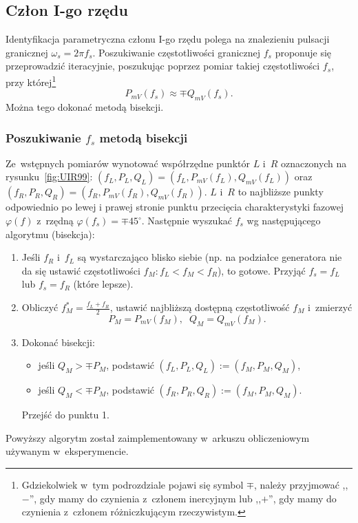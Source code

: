 \documentclass[paper=a4,DIV=12]{lpas}
\newcommand{\degree}{^{\circ}}
\begin{document}
\begin{appendices}
  \subsection{Człon I-go rzędu}
  \label{sec:4C7KI}

  Identyfikacja parametryczna członu I-go rzędu polega na znalezieniu pulsacji
  granicznej $\omega_s = 2 \pi f_s$. Poszukiwanie częstotliwości granicznej
  $f_s$ proponuje się przeprowadzić iteracyjnie, poszukując poprzez pomiar
  takiej częstotliwości $f_s$, przy której\footnote{Gdziekolwiek w~tym
  podrozdziale pojawi się symbol $\mp$, należy przyjmować ,,$-$'', gdy mamy do
  czynienia z~członem inercyjnym lub ,,$+$'', gdy mamy do czynienia z~członem
  różniczkującym rzeczywistym.}
  \begin{equation}
    P_{mV}(f_s) \approx \mp Q_{mV}(f_s).
    \label{eq:7M2JN}
  \end{equation}
  Można tego dokonać metodą bisekcji.

  \subsubsection{Poszukiwanie \texorpdfstring{$f_s$}{fs} metodą bisekcji}
  \label{sec:L0JNW}

  Ze~wstępnych pomiarów wynotować współrzędne punktór $L$ i~$R$ oznaczonych na
  rysunku~\ref{fig:UIR99}: $(f_L, P_L, Q_L) = (f_L, P_{mV}(f_L), Q_{mV}(f_L))$
  oraz $(f_R, P_R, Q_R) = (f_R, P_{mV}(f_R), Q_{mV}(f_R))$. $L$ i~$R$ to
  najbliższe punkty odpowiednio po lewej i prawej stronie punktu przecięcia
  charakterystyki fazowej $\varphi(f)$ z~rzędną $\varphi(f_s) = \mp 45\degree$.
  Następnie wyszukać $f_s$ wg następującego algorytmu (bisekcja):

  \begin{enumerate}
    \item Jeśli $f_R$ i~$f_L$ są wystarczająco blisko siebie (np. na podziałce
      generatora nie da się ustawić częstotliwości $f_M: f_L < f_M < f_R$), to
      gotowe. Przyjąć $f_s = f_L$ lub $f_s = f_R$ (które lepsze).
    \item Obliczyć $f_M^{*} = \frac{f_L + f_R}{2}$, ustawić najbliższą dostępną
      częstotliwość $f_M$ i~zmierzyć \[P_M = P_{mV}(f_M),\;\; Q_M = Q_{mV}(f_M).\]
    \item Dokonać bisekcji:
      \begin{itemize}
        \item jeśli $Q_M > \mp P_M$, podstawić $(f_L, P_L, Q_L) := (f_M, P_M, Q_M)$,
        \item jeśli $Q_M < \mp P_M$, podstawić $(f_R, P_R, Q_R) := (f_M, P_M, Q_M)$.
      \end{itemize}
      Przejść do punktu 1.
  \end{enumerate}
  Powyższy algorytm został zaimplementowany w~arkuszu obliczeniowym używanym
  w~eksperymencie.


\end{appendices}
\end{document}
